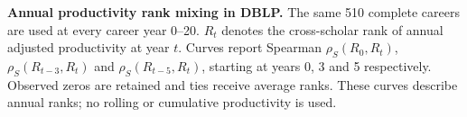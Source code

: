\textbf{Annual productivity rank mixing in DBLP.} The same 510 complete careers are used at every career year 0--20. $R_t$ denotes the cross-scholar rank of annual adjusted productivity at year $t$. Curves report Spearman $\rho_S(R_0,R_t)$, $\rho_S(R_{t-3},R_t)$ and $\rho_S(R_{t-5},R_t)$, starting at years 0, 3 and 5 respectively. Observed zeros are retained and ties receive average ranks. These curves describe annual ranks; no rolling or cumulative productivity is used.
